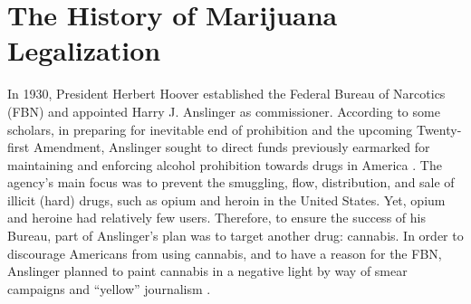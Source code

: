 







\section{The History of Marijuana Legalization}




In 1930, President Herbert Hoover established the Federal Bureau of Narcotics (FBN) and appointed Harry J. Anslinger as commissioner. According to some scholars, in preparing for inevitable end of prohibition and the upcoming Twenty-first Amendment, Anslinger sought to direct funds previously earmarked for maintaining and enforcing alcohol prohibition towards drugs in America \citep{hari_2015}. The agency's main focus was to prevent the smuggling, flow, distribution, and sale of illicit (hard) drugs, such as opium and heroin in the United States. Yet, opium and heroine had relatively few users. Therefore, to ensure the success of his Bureau, part of Anslinger's plan was to target another drug: cannabis. In order to discourage Americans from using cannabis, and to have a reason for the FBN, Anslinger planned to paint cannabis in a negative light by way of smear campaigns and ``yellow'' journalism \citep{mosher_and_akins_2019,newhart_and_dolphin_2018,rosenthal_and_kubby_1996}. 

